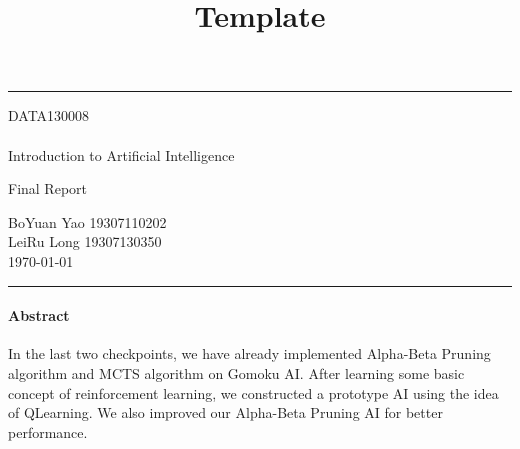 \documentclass[a4paper, 12pt]{article} %
\begin{document}
	
	
	\title{Template} %
	\fancyhead[C]{}
	\hrule \medskip %
	\begin{minipage}{0.295\textwidth} %
		\raggedright
		DATA130008\\ %
		\footnotesize %
		\hfill\\
		Introduction to Artificial Intelligence\\ %
	\end{minipage}
	\begin{minipage}{0.4\textwidth} %
		\centering
		\large %
		Final Report\\ %
		\normalsize %
	\end{minipage}
	\begin{minipage}{0.295\textwidth} %
		\raggedleft
		BoYuan Yao 19307110202\\ %
		LeiRu Long 19307130350
		\footnotesize %
		\hfill\\
		\today\\ %
	\end{minipage}
	\medskip\hrule %
	\bigskip
	
\paragraph{Abstract}
	In the last two checkpoints, we have already implemented Alpha-Beta Pruning algorithm and MCTS algorithm on Gomoku AI. After learning some basic concept of reinforcement learning, we constructed a prototype AI using the idea of QLearning. We also improved our Alpha-Beta Pruning AI for better performance.
		
\end{document}
